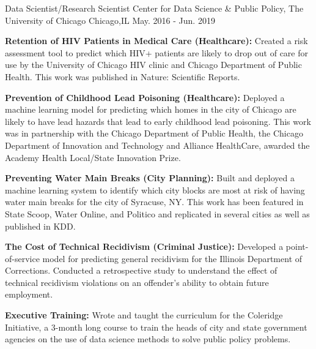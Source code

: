\begin{cventries}
\cventry
    {Data Scientist/Research Scientist} %
    {Center for Data Science \& Public Policy, The University of Chicago} %
    {Chicago,IL} %
    {May. 2016 - Jun. 2019} %
    {\begin{cvitems}
        \setlength\itemsep{.15em}
        \item { \textbf{Retention of HIV Patients in Medical Care (Healthcare): }Created a risk assessment tool to predict which HIV+ patients are likely to drop out of care for use by the University of Chicago HIV clinic and Chicago Department of Public Health. This work was published in Nature: Scientific Reports.}
        \item { \textbf{Prevention of Childhood Lead Poisoning (Healthcare): }Deployed a machine learning model for predicting which homes in the city of Chicago are likely to have lead hazards that lead to early childhood lead poisoning. This work was in  partnership with the Chicago Department of Public Health, the Chicago Department of Innovation and Technology and Alliance HealthCare, awarded the Academy Health Local/State Innovation Prize.}
         \item { \textbf{Preventing Water Main Breaks (City Planning): }Built and deployed a machine learning system to identify which city blocks are most at risk of having water main breaks for the city of Syracuse, NY. This work has been featured in State Scoop, Water Online, and Politico and replicated in several cities as well as published in KDD.}
         \item { \textbf{The Cost of Technical Recidivism (Criminal Justice): }Developed a point-of-service model for predicting general recidivism for the Illinois Department of Corrections. Conducted a retrospective study to understand the effect of technical recidivism violations on an offender's ability to obtain future employment.}
         \item{ \textbf{Executive Training: }Wrote and taught the curriculum for the Coleridge Initiative, a 3-month long course to train the heads of city and state government agencies on the use of data science methods to solve public policy problems.}
     \end{cvitems}}




\end{cventries}
